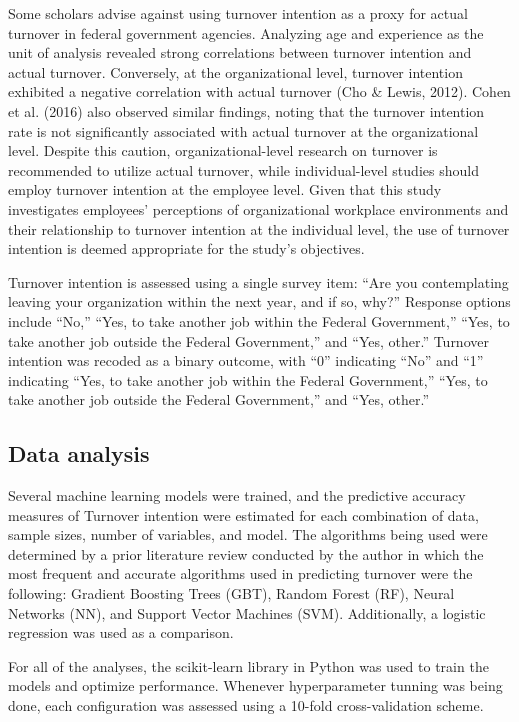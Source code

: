 \documentclass[
  man]{apa7}
\begin{document}
Some scholars advise against using turnover intention as a proxy for actual turnover in federal government agencies.
Analyzing age and experience as the unit of analysis revealed strong correlations between turnover intention and actual turnover.
Conversely, at the organizational level, turnover intention exhibited a negative correlation with actual turnover (Cho \& Lewis, 2012).
Cohen et al. (2016) also observed similar findings, noting that the turnover intention rate is not significantly associated with actual turnover at the organizational level.
Despite this caution, organizational-level research on turnover is recommended to utilize actual turnover, while individual-level studies should employ turnover intention at the employee level.
Given that this study investigates employees' perceptions of organizational workplace environments and their relationship to turnover intention at the individual level, the use of turnover intention is deemed appropriate for the study's objectives.

Turnover intention is assessed using a single survey item: ``Are you contemplating leaving your organization within the next year, and if so, why?'' Response options include ``No,'' ``Yes, to take another job within the Federal Government,'' ``Yes, to take another job outside the Federal Government,'' and ``Yes, other.'' Turnover intention was recoded as a binary outcome, with ``0'' indicating ``No'' and ``1'' indicating ``Yes, to take another job within the Federal Government,'' ``Yes, to take another job outside the Federal Government,'' and ``Yes, other.''

\hypertarget{data-analysis}{%
\subsection{Data analysis}\label{data-analysis}}

Several machine learning models were trained, and the predictive accuracy measures of Turnover intention were estimated for each combination of data, sample sizes, number of variables, and model.
The algorithms being used were determined by a prior literature review conducted by the author in which the most frequent and accurate algorithms used in predicting turnover were the following: Gradient Boosting Trees (GBT), Random Forest (RF), Neural Networks (NN), and Support Vector Machines (SVM).
Additionally, a logistic regression was used as a comparison.

For all of the analyses, the scikit-learn library in Python was used to train the models and optimize performance. Whenever hyperparameter tunning was being done, each configuration was assessed using a 10-fold cross-validation scheme.
\end{document}
